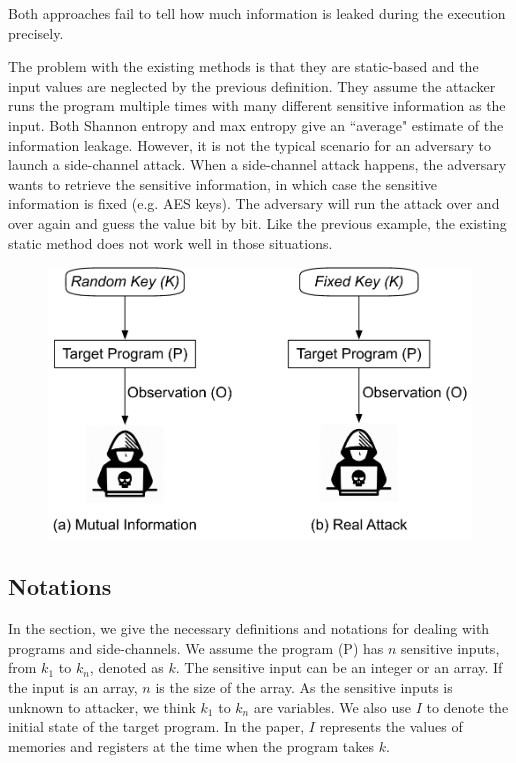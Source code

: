 Both approaches fail to tell how 
much information is leaked during the execution precisely.

The problem with the existing methods is that they are static-based and the 
input values are neglected by the previous definition. 
They assume the attacker runs the program multiple times with many different sensitive 
information as the input. Both Shannon entropy and max entropy give an ``average" 
estimate of the information leakage. However, it is not the typical scenario for an adversary to 
launch a side-channel attack. When a side-channel attack happens, the adversary wants 
to retrieve the sensitive information, in which case the sensitive information is fixed (e.g. AES keys). 
The adversary will run the attack over and over again and guess the value bit by bit. Like the 
previous example, the existing static method does not work well in those situations.

\begin{figure}
  \centering
   \includegraphics[width=.9\columnwidth]{./figures/RA.pdf}
   \caption{}
\end{figure}

\vspace*{3pt}

\subsection{Notations}
In the section, we give the necessary definitions and notations for dealing with programs and side-channels.
We assume the program (P) has $n$ sensitive inputs, from $k_1$ to $k_n$, denoted as $k$. 
The sensitive input
can be an integer or an array. If the input is an array, $n$ is the size of the array.
As the sensitive inputs is unknown to attacker, we think $k_1$ to $k_n$ are variables.
We also use $I$ to denote the initial state of the target program. In the paper, $I$
represents the values of memories and registers at the time when the program takes $k$.


